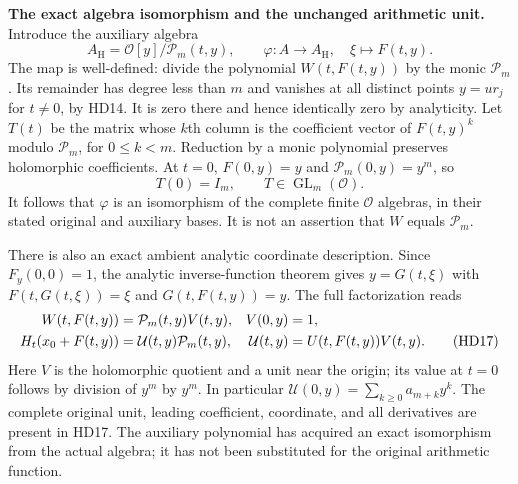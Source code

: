 \documentclass[11pt,a4paper]{article}
\theoremstyle{definition}\newtheorem{definition}[theorem]{Definition}
\begin{document}
\HD\textbf{The exact algebra isomorphism and the unchanged arithmetic unit.}
Introduce the auxiliary algebra
\[
 A_{\mathrm H}=\mathcal O[y]/\mathcal P_m(t,y),\qquad
 \varphi:A\longrightarrow A_{\mathrm H},\quad \xi\longmapsto F(t,y).
 \tag{HD15}\label{hd:isomorphism}
\]
The map is well-defined: divide the polynomial $W(t,F(t,y))$ by
the monic $\mathcal P_m$. Its remainder has degree less than $m$
and vanishes at all distinct points $y=ur_j$ for $t\ne0$, by HD14.
It is zero there and hence identically zero by analyticity.
Let $T(t)$ be the matrix whose $k$th column is the coefficient
vector of $F(t,y)^k$ modulo $\mathcal P_m$, for $0\le k<m$.
Reduction by a monic polynomial preserves holomorphic coefficients.
At $t=0$, $F(0,y)=y$ and $\mathcal P_m(0,y)=y^m$, so
\[
 T(0)=I_m,\qquad T\in\operatorname{GL}_m(\mathcal O).
 \tag{HD16}\label{hd:T}
\]
It follows that $\varphi$ is an isomorphism of the complete finite
$\mathcal O$ algebras, in their stated original and auxiliary bases.
It is not an assertion that $W$ equals $\mathcal P_m$.

There is also an exact ambient analytic coordinate description.
Since $F_y(0,0)=1$, the analytic inverse-function theorem gives
$y=G(t,\xi)$ with $F(t,G(t,\xi))=\xi$ and $G(t,F(t,y))=y$.
The full factorization reads
\begin{align}
 W(t,F(t,y))&=\mathcal P_m(t,y)V(t,y),& V(0,y)&=1,\notag\\
 H_t(x_0+F(t,y))&=\mathcal U(t,y)\mathcal P_m(t,y),&
 \mathcal U(t,y)&=U(t,F(t,y))V(t,y).
 \tag{HD17}\label{hd:unit}
\end{align}
Here $V$ is the holomorphic quotient and a unit near the origin;
its value at $t=0$ follows by division of $y^m$ by $y^m$.
In particular $\mathcal U(0,y)=\sum_{k\ge0}a_{m+k}y^k$.
The complete original unit, leading coefficient, coordinate,
and all derivatives are present in HD17. The auxiliary polynomial
has acquired an exact isomorphism from the actual algebra; it has
not been substituted for the original arithmetic function.
\end{document}
